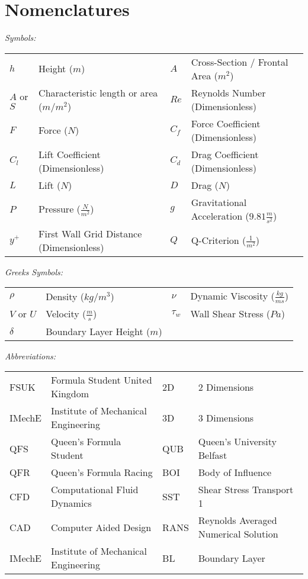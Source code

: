 \newpage
\thispagestyle{empty}
\section*{Nomenclatures} 
\flushleft
\begin{doublespace}
\textit{Symbols:}

\begin{tabular}{l l  l l }
$h$ & Height ($m$) & $A$ & Cross-Section / Frontal Area ($m^2$) \\
$A$ or $S$ & Characteristic length or area ($m$/$m^2$) & $Re$ & Reynolds Number (Dimensionless) \\
$F$ & Force ($N$) & $C_f$ & Force Coefficient (Dimensionless)\\
$C_l$ & Lift Coefficient (Dimensionless) & $C_d$ & Drag Coefficient (Dimensionless) \\
$L$ & Lift ($N$) & $D$ & Drag ($N$) \\
$P$ & Pressure ($\frac{N}{m^2}$) & $g$ & Gravitational Acceleration ($9.81\frac{m}{s^2}$)\\
$y^+$ & First Wall Grid Distance (Dimensionless) & $Q$ & Q-Criterion ($\frac{1}{m^2}$) \\
\end{tabular}

\textit{Greeks Symbols:}

\begin{tabular}{llll}
$\rho$ & Density ($kg/m^3$) & $\nu$ & Dynamic Viscosity ($\frac{kg}{ms}$) \\
$V$ or $U$ & Velocity ($\frac{m}{s}$) & $\tau_w$ & Wall Shear Stress ($Pa$)\\
$\delta$ & Boundary Layer Height ($m$) \\
\end{tabular}


\textit{Abbreviations:}

\begin{tabular}{llll}
FSUK & Formula Student United Kingdom & 2D & 2 Dimensions \\
IMechE & Institute of Mechanical Engineering & 3D & 3 Dimensions\\
QFS & Queen's Formula Student & QUB & Queen's University Belfast\\
QFR & Queen's Formula Racing & BOI & Body of Influence\\
CFD & Computational Fluid Dynamics & SST & Shear Stress Transport 1\\
CAD & Computer Aided Design & RANS & Reynolds Averaged Numerical Solution\\
IMechE & Institute of Mechanical Engineering & BL & Boundary Layer\\
\end{tabular}
\end{doublespace}